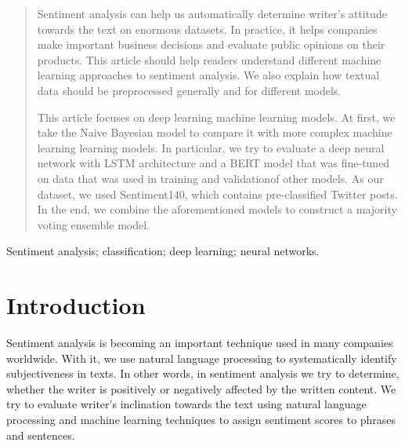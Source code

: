 \documentclass[conference]{IEEEtran}
\begin{document}
\begin{abstract}
Sentiment analysis can help us automatically determine writer's attitude towards the text on enormous datasets. In practice, it helps companies make important business decisions and evaluate public opinions on their products. This article should help readers understand different machine learning approaches to sentiment analysis. We also explain how textual data should be preprocessed generally and for different models. 

This article focuses on deep learning machine learning models. At first, we take the Naive Bayesian model to compare it with more complex machine learning  learning models. In particular, we try to evaluate a deep neural network with LSTM architecture and a BERT model that was fine-tuned on data that was used in training and validationof other models. As our dataset, we used Sentiment140, which contains pre-classified Twitter posts. In the end, we combine the aforementioned models to construct a majority voting ensemble model.


\end{abstract}

\begin{IEEEkeywords}
Sentiment analysis; classification; deep learning; neural networks.
\end{IEEEkeywords}




%
\IEEEpeerreviewmaketitle



\section{Introduction}
Sentiment analysis is becoming an important technique used in many companies worldwide. With it, we use natural language processing to systematically identify subjectiveness in texts. In other words, in sentiment analysis we try to determine, whether the writer is positively or negatively affected by the written content. 
We try to evaluate writer's inclination towards the text using natural language processing and machine learning techniques to assign sentiment scores to phrases and sentences.  
\end{document}
